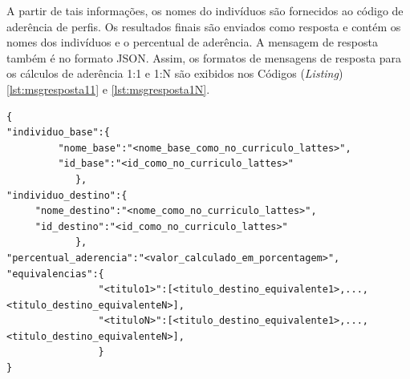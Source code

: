 A partir de tais informações, os nomes do indivíduos são fornecidos ao código de aderência de perfis. Os resultados finais são enviados como resposta e contém os nomes dos indivíduos e o percentual de aderência. A mensagem de resposta também é no formato JSON. Assim, os formatos de mensagens de resposta para os cálculos de aderência 1:1 e 1:N são exibidos nos Códigos (\textit{Listing}) \ref{lst:msgresposta11} e \ref{lst:msgresposta1N}.



\begin{lstlisting}[caption={Formato de mensagem de resposta(1:1).},label={lst:msgresposta11}]
{
"individuo_base":{
         "nome_base":"<nome_base_como_no_curriculo_lattes>",
         "id_base":"<id_como_no_curriculo_lattes>"
            },
"individuo_destino":{
     "nome_destino":"<nome_como_no_curriculo_lattes>",
     "id_destino":"<id_como_no_curriculo_lattes>"
            },
"percentual_aderencia":"<valor_calculado_em_porcentagem>",
"equivalencias":{
				"<titulo1>":[<titulo_destino_equivalente1>,...,<titulo_destino_equivalenteN>],
				"<tituloN>":[<titulo_destino_equivalente1>,...,<titulo_destino_equivalenteN>],
				}
}


\end{lstlisting}



